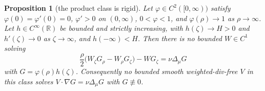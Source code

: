\documentclass[11pt]{article}
\newtheorem{proposition}[theorem]{Proposition}
\theoremstyle{definition}
\newcommand{\R}{\mathbb{R}}
\begin{document}
\begin{proposition}[the product class is rigid]\label{prop:product}
Let $\varphi\in C^2([0,\infty))$ satisfy $\varphi(0)=\varphi'(0)=0$,
$\varphi'>0$ on $(0,\infty)$, $0<\varphi<1$, and $\varphi(\rho)\to1$ as
$\rho\to\infty$. Let $h\in C^\infty(\R)$ be bounded and strictly increasing,
with $h(\zeta)\to H>0$ and $h'(\zeta)\to0$ as $\zeta\to\infty$, and
$h(-\infty)<H$. Then there is no bounded $W\in C^1$ solving
\begin{equation}\label{eq:2dW}
\frac{\rho}{2}\bigl(W_\zeta G_\rho-W_\rho G_\zeta\bigr)-WG_\zeta
=\nu\Delta_\mu G
\end{equation}
with $G=\varphi(\rho)h(\zeta)$. Consequently no bounded smooth weighted-div-free
$V$ in this class solves $V\cdot\nabla G=\nu\Delta_\mu G$ with $G\not\equiv0$.
\end{proposition}
\end{document}
